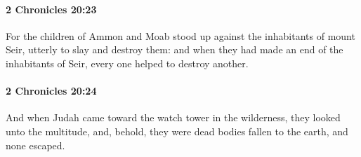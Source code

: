 		\paragraph{2 Chronicles 20:23} %
			\label{2CHRONICLES-20-23}

			For the children of Ammon and Moab stood up against the inhabitants of mount Seir, utterly to slay and destroy them: and when they had made an end of the inhabitants of Seir, every one helped to destroy another.


		\paragraph{2 Chronicles 20:24} %
			\label{2CHRONICLES-20-24}

			And when Judah came toward the watch tower in the wilderness, they looked unto the multitude, and, behold, they were dead bodies fallen to the earth, and none escaped.

